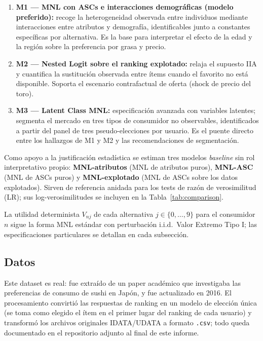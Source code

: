 \documentclass[12pt,a4paper]{article}
\begin{document}
\begin{enumerate}[nosep]
  \item \textbf{M1 --- MNL con ASCs e interacciones demográficas (modelo preferido):} recoge la heterogeneidad observada entre individuos mediante interacciones entre atributos y demografía, identificables junto a constantes específicas por alternativa. Es la base para interpretar el efecto de la edad y la región sobre la preferencia por grasa y precio.
  \item \textbf{M2 --- Nested Logit sobre el ranking explotado:} relaja el supuesto IIA y cuantifica la sustitución observada entre ítems cuando el favorito no está disponible. Soporta el escenario contrafactual de oferta (shock de precio del toro).
  \item \textbf{M3 --- Latent Class MNL:} especificación avanzada con variables latentes; segmenta el mercado en tres tipos de consumidor no observables, identificados a partir del panel de tres pseudo-elecciones por usuario. Es el puente directo entre los hallazgos de M1 y M2 y las recomendaciones de segmentación.
\end{enumerate}

Como apoyo a la justificación estadística se estiman tres modelos \emph{baseline} sin rol interpretativo propio: \textbf{MNL-atributos} (MNL de atributos puros), \textbf{MNL-ASC} (MNL de ASCs puros) y \textbf{MNL-explotado} (MNL de ASCs sobre los datos explotados). Sirven de referencia anidada para los tests de razón de verosimilitud (LR); sus log-verosimilitudes se incluyen en la Tabla~\ref{tab:comparison}.

La utilidad determinista $V_{nj}$ de cada alternativa $j \in \{0, \dots, 9\}$ para el consumidor $n$ sigue la forma MNL estándar con perturbación i.i.d.\ Valor Extremo Tipo I; las especificaciones particulares se detallan en cada subsección.

\subsection{Datos}

Este dataset es real: fue extraído de un paper académico que investigaba las preferencias de consumo de sushi en Japón, y fue actualizado en 2016. El procesamiento convirtió las respuestas de ranking en un modelo de elección única (se toma como elegido el ítem en el primer lugar del ranking de cada usuario) y transformó los archivos originales IDATA/UDATA a formato \texttt{.csv}; todo queda documentado en el repositorio adjunto al final de este informe.
\end{document}

